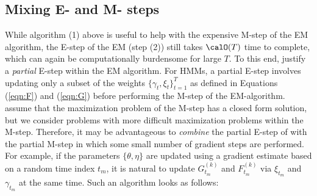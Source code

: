 

\subsection{Mixing E- and M- steps}

While algorithm (1) above is useful to help with the expensive M-step of the EM algorithm, the E-step of the EM (step (2)) still takes $\calO(T)$ time to complete, which can again be computationally burdensome for large $T$. To this end, \citet{Neal:1998} justify a \textit{partial} E-step within the EM algorithm. For HMMs, a partial E-step involves updating only a subset of the weights $\{\gamma_t,\xi_t\}_{t=1}^T$ as defined in Equations (\ref{eqn:F}) and (\ref{eqn:G}) before performing the M-step of the EM-algorithm. \citet{Neal:1998} assume that the maximization problem of the M-step has a closed form solution, but we consider problems with more difficult maximization problems within the M-step. 
Therefore, it may be advantageous to \textit{combine} the partial E-step of \citet{Neal:1998} with the partial M-step in which some small number of gradient steps are performed. For example, if the parameters $\{\theta, \eta\}$ are updated using a gradient estimate based on a random time index $t_m$, it is natural to update $G_{t_m}^{(k)}$ and $F_{t_m}^{(k)}$ via $\xi_{t_m}$ and $\gamma_{t_m}$ at the same time. Such an algorithm looks as follows:

